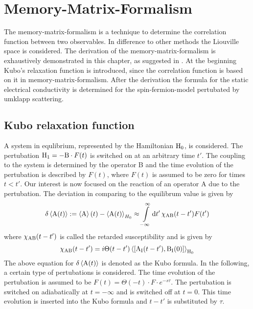 %
%
%
\chapter{Memory-Matrix-Formalism}
\label{ch:memory matrix formalism} 
%
%
%
The memory-matrix-formalism is a technique to determine the correlation function between two observables.
In difference to other methods the Liouville space is considered.
The derivation of the memory-matrix-formalism is exhaustively demonstrated in this chapter, as suggested in \cite{Forster}.
At the beginning Kubo's relaxation function is introduced, since the correlation function is based on it in memory-matrix-formalism.
After the derivation the formula for the static electrical conductivity is determined for the spin-fermion-model pertubated by umklapp scattering.
%
%
\section{Kubo relaxation function}
\label{sec:kubo relaxation function}
%
%
A system in equlibrium, represented by the Hamiltonian $\mathrm{H}_{0}$, is considered.
The pertubation $\mathrm{H}_{1} = -\mathrm{B} \cdot F(t)$ is switched on at an arbitrary time $t'$.
The coupling to the system is determined by the operator B and the time evolution of the pertubation is described by $F(t)$, where $F(t)$ is assumed to be zero for times $t<t'$.
Our interest is now focused on the reaction of an operator A due to the pertubation.
The deviation in comparing to the equilibrum value is given by
%
\begin{align}
	\delta\expval{\mathrm{A}(t)} := \expval{\mathrm{A}}(t) - \expval{\mathrm{A}(t)}_{H_{0}} \approx \int\limits_{-\infty}^{\infty} \dd{t'} \chi_{\mathrm{AB}}(t-t') F(t')
	\label{eq:Kubo formula}
\end{align}
%
where $\chi_{\mathrm{AB}}(t-t')$ is called the retarded susceptibility and is given by
%
\begin{align}
	\chi_{\mt{AB}}(t-t') = i \Theta(t-t') \expval{\comm{\mt{A}_{\mt{I}}(t-t')}{\mt{B}_{\mt{I}}(0)}}_{\mt{H}_{0}}
	\label{eq:dynamical susceptibilty}
\end{align}
% 
The above equation for $\delta\expval{\mathrm{A}(t)}$ is denoted as the Kubo formula.
In the following, a certain type of pertubations is considered.
The time evolution of the pertubation is assumed to be $F(t) = \Theta(-t) \cdot F \cdot e^{-s\tau}$.
The pertubation is switched on adiabatically at $t = -\infty$ and is switched off at $t=0$.
This time evolution is inserted into the Kubo formula and $t-t'$ is substituted by $\tau$.
